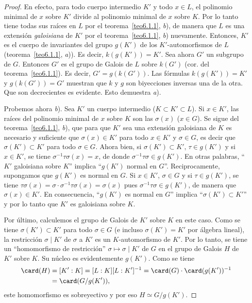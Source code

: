 \documentclass[oneside,bibtotoc,leqno,spanish]{amsbook}
\newcommand{\QED}{}%
\numberwithin{equation}{section}
\theoremstyle{defi}
\theoremstyle{note}
\theoremstyle{rem}
\numberwithin{theorem}{section}
\numberwithin{proposition}{section}
\numberwithin{definition}{section}
\numberwithin{lemma}{section}
\numberwithin{corollary}{section}
\numberwithin{example}{section}
\numberwithin{footnote}{section}%
\begin{document}
\begin{proof}
En efecto, para todo cuerpo intermedio $K'$ y todo $x\in L$, el polinomio minimal de $x$
sobre $K'$ divide
al polinomio minimal de $x$ sobre $K$. Por lo tanto tiene todas sus ra\'ices en $L$ por
el teorema~\ref{teo6.1.1}, {\itshape b}),
de manera que $L$ es una extensi\'on {\em galoisiana} de $K'$ por el teorema~\ref{teo6.1.1},
{\itshape b}) nuevamente.
Entonces, $K'$ es el cuerpo de invariantes del grupo $g(K')$ de los $K'$-automorfismos de $L$
(teorema~\ref{teo6.1.1}, {\itshape a})). Es decir, $k(g(K')) = K'$. Sea ahora $G'$
un subgrupo de $G$. Entonces
$G'$ es el grupo de Galois de $L$ sobre $k(G')$ (cor. del teorema~\ref{teo6.1.1}).
Es decir, $G' = g(k(G'))$.
Las f\'ormulas $k(g(K')) = K'$ y $g(k(G')) = G'$ muestran que $k$ y $g$ son biyecciones 
inversas una de la otra.
Que son decrecientes es evidente. Esto demuestra {\itshape a}).

Probemos ahora {\itshape b}). Sea $K'$ un cuerpo intermedio ($K\subset K'\subset L$). Si $x\in K'$, las
ra\'ices del polinomio minimal de $x$ sobre $K$ son las $\sigma(x)$ ($x\in G$). Se sigue
del teorema~\ref{teo6.1.1}, {\itshape b}),
que para que $K'$ sea una extensi\'on galoisiana de $K$ es necesario y suficiente
que $\sigma(x)\in K'$
para todo $x\in K'$ y $\sigma\in G$, es decir que $\sigma(K')\subset K'$ para
todo $\sigma\in G$. Ahora bien,
si $\sigma(K')\subset K'$, $\tau\in g(K')$ y si $x\in K'$, se tiene
$\sigma^{-1}\tau\sigma(x) = x$, de donde
$\sigma^{-1}\tau\sigma\in g(K')$. En otras palabras, ``$K'$ galoisiana sobre $K$''
implica ``$g(K')$ normal
en $G$''. Reciprocamente, supongamos que $g(K')$ es normal en $G$. Si $x\in K'$,
$\sigma\in G$ y si
$\tau\in g(K')$, se tiene
$\tau\sigma(x) = \sigma\cdot\sigma^{-1}\tau\sigma(x) = \sigma(x)$ pues
$\sigma^{-1}\tau\sigma\in g(K')$, de manera que $\sigma(x) \in K'$.
En consecuencia, ``$g(K')$ es normal
en $G$'' implica ``$\sigma(K')\subset K'$'' y por lo tanto que $K'$ es galoisiana sobre $K$.

Por \'ultimo, calculemos el grupo de Galois de $K'$ sobre $K$ en este caso. Como se
tiene $\sigma(K')\subset K'$
para todo $\sigma\in G$ (e incluso $\sigma(K') = K'$ por \'algebra lineal), la restricci\'on
$\sigma\mid K'$ de $\sigma$ a $K'$ es un $K$-automorfismo de $K'$. Por lo tanto, se tiene un
``homomorfismo de restricci\'on'' $\sigma\mapsto\sigma\mid K'$ de $G$ en el grupo de
Galois $H$ de $K'$ sobre $K$.
Su n\'ucleo es evidentemente $g(K')$. Como se tiene
\begin{align*}
\card(H) &= [K':K]=[L:K][L:K']^{-1}=\card(G)\cdot\card(g(K'))^{-1}\\
&= \card(G/g(K')),
\end{align*}
este homomorfismo es sobreyectivo y por eso $H\simeq G/g(K')$. \QED
\end{proof}
\end{document}
